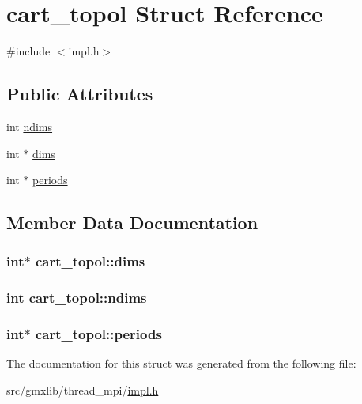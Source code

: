 \hypertarget{structcart__topol}{\section{cart\-\_\-topol \-Struct \-Reference}
\label{structcart__topol}
}


{\ttfamily \#include $<$impl.\-h$>$}

\subsection*{\-Public \-Attributes}
\begin{DoxyCompactItemize}
\item 
int \hyperlink{structcart__topol_afe2170ab2173f58e83c1d202655b7f9d}{ndims}
\item 
int $\ast$ \hyperlink{structcart__topol_ab7e18b7648ef4fd317d22dfdcb59d41d}{dims}
\item 
int $\ast$ \hyperlink{structcart__topol_a86d6cee2d1b234c149446aacff7cf004}{periods}
\end{DoxyCompactItemize}


\subsection{\-Member \-Data \-Documentation}
\hypertarget{structcart__topol_ab7e18b7648ef4fd317d22dfdcb59d41d}{
\subsubsection[{dims}]{\setlength{\rightskip}{0pt plus 5cm}int$\ast$ {\bf cart\-\_\-topol\-::dims}}}\label{structcart__topol_ab7e18b7648ef4fd317d22dfdcb59d41d}
\hypertarget{structcart__topol_afe2170ab2173f58e83c1d202655b7f9d}{
\subsubsection[{ndims}]{\setlength{\rightskip}{0pt plus 5cm}int {\bf cart\-\_\-topol\-::ndims}}}\label{structcart__topol_afe2170ab2173f58e83c1d202655b7f9d}
\hypertarget{structcart__topol_a86d6cee2d1b234c149446aacff7cf004}{
\subsubsection[{periods}]{\setlength{\rightskip}{0pt plus 5cm}int$\ast$ {\bf cart\-\_\-topol\-::periods}}}\label{structcart__topol_a86d6cee2d1b234c149446aacff7cf004}


\-The documentation for this struct was generated from the following file\-:\begin{DoxyCompactItemize}
\item 
src/gmxlib/thread\-\_\-mpi/\hyperlink{impl_8h}{impl.\-h}\end{DoxyCompactItemize}

